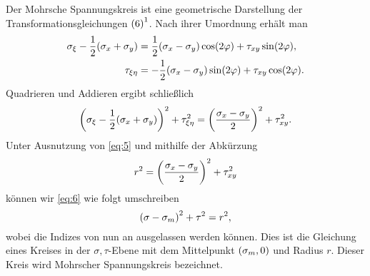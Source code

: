 \documentclass{lecture}
\begin{document}
    Der Mohrsche Spannungskreis ist eine geometrische Darstellung der Transformationsgleichungen \(\textup{(6)}^1\).
    Nach ihrer Umordnung erhält man
    \begin{align*}
        \sigma_\xi - \frac{1}{2}\parentheses*{\sigma_x + \sigma_y} &= \frac{1}{2}\parentheses*{\sigma_x - \sigma_y}\cos\parentheses*{2\varphi} + \tau_{xy}\sin\parentheses*{2\varphi},\\
        \tau_{\xi\eta} &= -\frac{1}{2}\parentheses*{\sigma_x - \sigma_y}\sin\parentheses*{2\varphi} + \tau_{xy}\cos\parentheses*{2\varphi}.
    \end{align*}
    Quadrieren und Addieren ergibt schließlich
    \begin{equation}\label{eq:6}
        \parentheses*{\sigma_\xi - \frac{1}{2}\parentheses*{\sigma_x + \sigma_y}}^2 + \tau_{\xi\eta}^2 = \parentheses*{\frac{\sigma_x - \sigma_y}{2}}^2 + \tau_{xy}^2.
    \end{equation}
    Unter Ausnutzung von \eqref{eq:5} und mithilfe der Abkürzung
    \begin{equation}\label{eq:7}
        r^2 = \parentheses*{\frac{\sigma_x - \sigma_y}{2}}^2 + \tau_{xy}^2
    \end{equation}
    können wir \eqref{eq:6} wie folgt umschreiben
    \[
        \parentheses*{\sigma - \sigma_m}^2 + \tau^2 = r^2,
    \]
    wobei die Indizes von nun an ausgelassen werden können.
    Dies ist die Gleichung eines Kreises in der \(\sigma, \tau\)-Ebene mit dem Mittelpunkt \(\parentheses*{\sigma_m, 0}\) und Radius \(r\).
    Dieser Kreis wird Mohrscher Spannungskreis bezeichnet.
\end{document}
